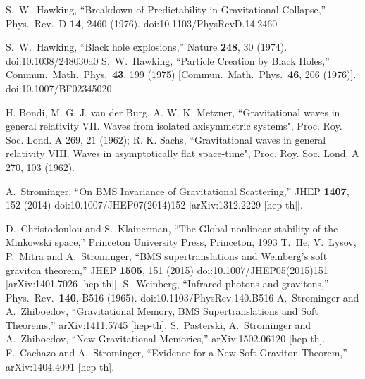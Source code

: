 \documentclass[12pt]{article}
\numberwithin{equation}{section}
\begin{document}
\begin{thebibliography}{99}
  S.~W.~Hawking,
  ``Breakdown of Predictability in Gravitational Collapse,''
  Phys.\ Rev.\ D {\bf 14}, 2460 (1976).
  doi:10.1103/PhysRevD.14.2460
  
  S.~W.~Hawking,
  ``Black hole explosions,''
  Nature {\bf 248}, 30 (1974).
  doi:10.1038/248030a0
  S.~W.~Hawking,
  ``Particle Creation by Black Holes,''
  Commun.\ Math.\ Phys.\  {\bf 43}, 199 (1975)
  [Commun.\ Math.\ Phys.\  {\bf 46}, 206 (1976)].
  doi:10.1007/BF02345020
  
   H. Bondi, M. G. J. van der Burg, A. W. K. Metzner, ``Gravitational waves in general relativity VII.
Waves from isolated axisymmetric systems", Proc. Roy. Soc. Lond. A 269, 21 (1962);
 R. K. Sachs, ``Gravitational waves in general relativity VIII. Waves in asymptotically flat space-time",
Proc. Roy. Soc. Lond. A 270, 103 (1962).

  A.~Strominger,
  ``On BMS Invariance of Gravitational Scattering,''
  JHEP {\bf 1407}, 152 (2014)
  doi:10.1007/JHEP07(2014)152
  [arXiv:1312.2229 [hep-th]].

  D.~Christodoulou and S.~Klainerman,
  ``The Global nonlinear stability of the Minkowski space,''
  Princeton University Press, Princeton, 1993
  T.~He, V.~Lysov, P.~Mitra and A.~Strominger,
  ``BMS supertranslations and Weinberg's soft graviton theorem,''
  JHEP {\bf 1505}, 151 (2015)
  doi:10.1007/JHEP05(2015)151
  [arXiv:1401.7026 [hep-th]].
  S.~Weinberg,
  ``Infrared photons and gravitons,''
  Phys.\ Rev.\  {\bf 140}, B516 (1965).
  doi:10.1103/PhysRev.140.B516
  A.~Strominger and A.~Zhiboedov,
  ``Gravitational Memory, BMS Supertranslations and Soft Theorems,''
  arXiv:1411.5745 [hep-th].
  S.~Pasterski, A.~Strominger and A.~Zhiboedov,
  ``New Gravitational Memories,''
  arXiv:1502.06120 [hep-th].
  F.~Cachazo and A.~Strominger,
  ``Evidence for a New Soft Graviton Theorem,''
  arXiv:1404.4091 [hep-th].


\end{thebibliography}
\end{document}
